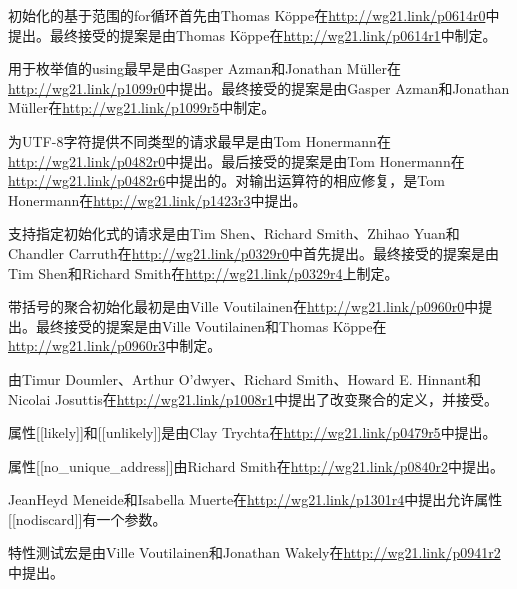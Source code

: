 初始化的基于范围的for循环首先由Thomas Köppe在\url{http://wg21.link/p0614r0}中提出。最终接受的提案是由Thomas Köppe在\url{http://wg21.link/p0614r1}中制定。

用于枚举值的using最早是由Gasper Azman和Jonathan M{\"u}ller在\url{http://wg21.link/p1099r0}中提出。最终接受的提案是由Gasper Azman和Jonathan M{\"u}ller在{}\url{http://wg21.link/p1099r5}中制定。

为UTF-8字符提供不同类型的请求最早是由Tom Honermann在\url{http://wg21.link/p0482r0}中提出。最后接受的提案是由Tom Honermann在\url{http://wg21.link/p0482r6}中提出的。对输出运算符的相应修复，是Tom Honermann在\url{http://wg21.link/p1423r3}中提出。

支持指定初始化式的请求是由Tim Shen、Richard Smith、Zhihao Yuan和Chandler Carruth在\url{http://wg21.link/p0329r0}中首先提出。最终接受的提案是由Tim Shen和Richard Smith在\url{http://wg21.link/p0329r4}上制定。

带括号的聚合初始化最初是由Ville Voutilainen在\url{http://wg21.link/p0960r0}中提出。最终接受的提案是由Ville Voutilainen和Thomas Köppe在\url{http://wg21.link/p0960r3}中制定。

由Timur Doumler、Arthur O’dwyer、Richard Smith、Howard E. Hinnant和Nicolai Josuttis在\url{http://wg21.link/p1008r1}中提出了改变聚合的定义，并接受。

属性[[likely]]和[[unlikely]]是由Clay Trychta在\url{http://wg21.link/p0479r5}中提出。

属性[[no\_unique\_address]]由Richard Smith在\url{http://wg21.link/p0840r2}中提出。

JeanHeyd Meneide和Isabella Muerte在\url{http://wg21.link/p1301r4}中提出允许属性[[nodiscard]]有一个参数。

特性测试宏是由Ville Voutilainen和Jonathan Wakely在\url{http://wg21.link/p0941r2}中提出。





